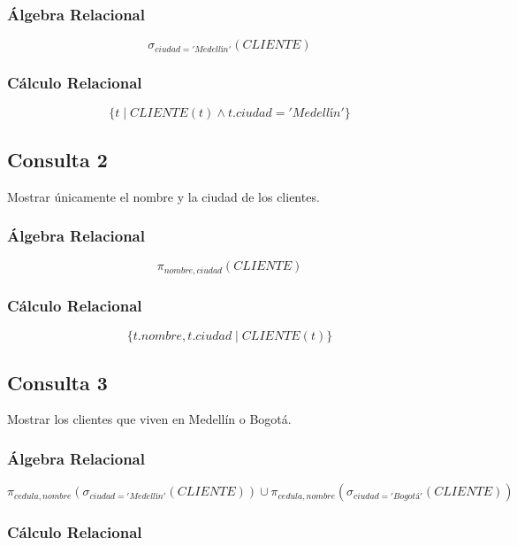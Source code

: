 \documentclass[stu,12pt,floatsintext]{apa7}
\begin{document}
\subsubsection{Álgebra Relacional}

\[
\sigma_{ciudad='Medellín'}(CLIENTE)
\]

\subsubsection{Cálculo Relacional}

\[
\{t \mid CLIENTE(t) \land t.ciudad='Medellín'\}
\]


\subsection{Consulta 2}
Mostrar únicamente el nombre y la ciudad de los clientes.

\subsubsection{Álgebra Relacional}

\[
\pi_{nombre,ciudad}(CLIENTE)
\]

\subsubsection{Cálculo Relacional}

\[
\{t.nombre,t.ciudad \mid CLIENTE(t)\}
\]


\subsection{Consulta 3}
Mostrar los clientes que viven en Medellín o Bogotá.

\subsubsection{Álgebra Relacional}

\[
\pi_{cedula,nombre}
(\sigma_{ciudad='Medellín'}(CLIENTE))
\cup
\pi_{cedula,nombre}
(\sigma_{ciudad='Bogotá'}(CLIENTE))
\]

\subsubsection{Cálculo Relacional}
\end{document}
